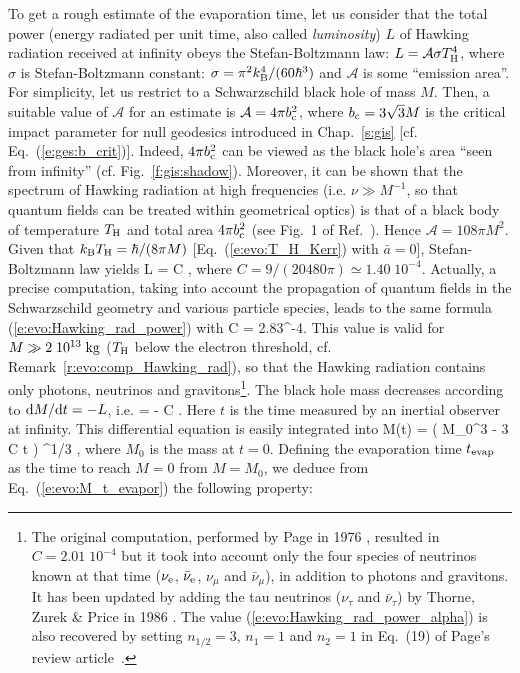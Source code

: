 To get a rough estimate of the evaporation time, let us consider
that the total power
(energy radiated per unit time, also called \emph{luminosity}) $L$ of Hawking radiation received at infinity
obeys the Stefan-Boltzmann law:
$L = \mathcal{A} \sigma T_{\rm H}^4$, where $\sigma$ is Stefan-Boltzmann constant:
$\sigma = \pi^2 k_{\rm B}^4/(60 \hbar^3)$ and $\mathcal{A}$ is some ``emission area''.
For simplicity, let us restrict to a Schwarzschild black hole of mass $M$. Then, a
suitable value of $\mathcal{A}$ for an estimate is
$\mathcal{A} = 4\pi b_{\rm c}^2$, where
$b_{\rm c} = 3\sqrt{3} M$ is the critical impact parameter for null geodesics
introduced in Chap.~\ref{s:gis} [cf. Eq.~(\ref{e:ges:b_crit})]. Indeed, $4 \pi b_{\rm c}^2$
can be viewed as the black hole's area ``seen from infinity'' (cf. Fig.~\ref{f:gis:shadow}).
Moreover, it can be shown that the spectrum of Hawking radiation at high frequencies (i.e. $\nu \gg M^{-1}$, so that quantum fields can be treated within geometrical optics) is that of a black
body of temperature $T_{\rm H}$ and total area $4\pi b_{\rm c}^2$ (see Fig.~1 of Ref.~\cite{Page76}). Hence
$\mathcal{A} = 108\pi M^2$. Given that
$k_{\rm B} T_{\rm H} = \hbar/(8\pi M)$ [Eq.~(\ref{e:evo:T_H_Kerr}) with $\bar{a}=0$],
Stefan-Boltzmann law yields
\be \label{e:evo:Hawking_rad_power}
    L = C  ,
\ee
where $C = 9 / (20480\pi) \simeq 1.40\; 10^{-4}$.
Actually, a precise computation, taking
into account the propagation of quantum fields in the Schwarzschild geometry
and various particle species,
leads to the same formula (\ref{e:evo:Hawking_rad_power}) with \cite{ThornZP86,Page76,Page05}
\be \label{e:evo:Hawking_rad_power_alpha}
    C = 2.83^{-4}.
\ee
This value is valid for $M \gg 2\; 10^{13} {\rm\; kg}$ ($T_{\rm H}$
below the electron threshold, cf. Remark~\ref{r:evo:comp_Hawking_rad}), so that the Hawking radiation
contains only photons, neutrinos and gravitons\footnote{The original computation,
performed by Page in 1976 \cite{Page76}, resulted
in $C=2.01\; 10^{-4}$ but it took into account only the four species
of neutrinos known at that time ($\nu_{\rm e}$, $\bar{\nu}_{\rm e}$, $\nu_\mu$ and
$\bar{\nu}_\mu$), in addition to photons and gravitons. It has been updated
by adding the tau neutrinos ($\nu_\tau$ and $\bar{\nu}_\tau$)
by Thorne, Zurek \& Price in 1986 \cite{ThornZP86}.
The value (\ref{e:evo:Hawking_rad_power_alpha}) is also recovered by
setting $n_{1/2}=3$, $n_1=1$ and $n_2=1$ in Eq.~(19) of Page's review article~\cite{Page05}.}.
The black hole mass decreases according to $\mathrm{d} M/\mathrm{d} t = - L$, i.e.
\be \label{e:evo:Hawking_rad_mass_decrease}
     = - C  .
\ee
Here $t$ is the time measured by an inertial observer at infinity.
This differential equation is easily integrated into
\be \label{e:evo:M_t_evapor}
    M(t) = \left( M_0^3 - 3 C \hbar t \right) ^{1/3} ,
\ee
where $M_0$ is the mass at $t=0$. Defining the evaporation time $t_{\rm evap}$
as the time to reach $M=0$ from $M = M_0$, we deduce from Eq.~(\ref{e:evo:M_t_evapor}) the
following property:


